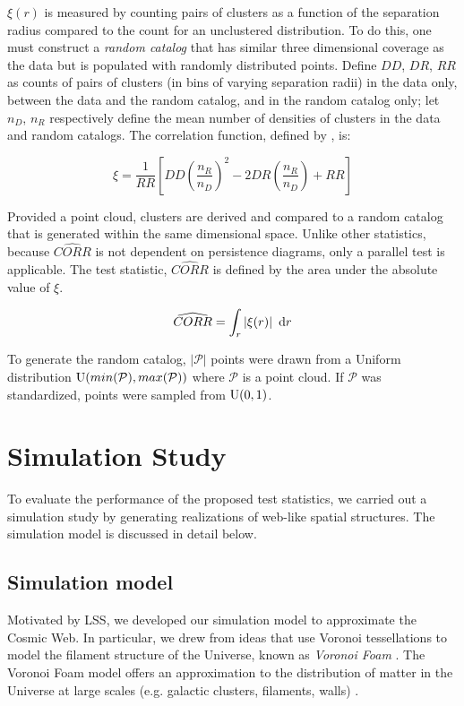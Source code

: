 \documentclass[12pt]{article}
\begin{document}
$\xi(r)$ is measured by counting pairs of clusters as a function of the separation radius compared to the count for an unclustered distribution. To do this, one must construct a \textit{random catalog} that has similar three dimensional coverage as the data but is populated with randomly distributed points. Define $DD$, $DR$, $RR$ as counts of pairs of clusters (in bins of varying separation radii) in the data only, between the data and the random catalog, and in the random catalog only; let $n_{D}$, $n_{R}$ respectively define the mean number of densities of clusters in the data and random catalogs. The correlation function, defined by \citep{landy1993bias}, is:

\[ \xi = \frac{1}{RR}\left[DD\left(\frac{n_{R}}{n_{D}}\right)^{2} - 2DR\left(\frac{n_{R}}{n_{D}}\right) + RR\right] \]

Provided a point cloud, clusters are derived and compared to a random catalog that is generated within the same dimensional space. Unlike other statistics, because $\widehat{CORR}$ is not dependent on persistence diagrams, only a parallel test is applicable. The test statistic, $\widehat{CORR}$ is defined by the area under the absolute value of $\xi$.

\[ \widehat{CORR} = \int_{r} \left | \xi(r) \right | \textup{ d}r \]

To generate the random catalog, $\left | \mathcal P \right |$ points were drawn from a Uniform distribution $\textup{U}(min(\mathcal P), max(\mathcal P))$ where $\mathcal P$ is a point cloud. If $\mathcal P$ was standardized, points were sampled from $\textup{U}(0, 1)$.


\section{Simulation Study}
\label{sec:simulation}

To evaluate the performance of the proposed test statistics, we carried out a simulation study by generating realizations of web-like spatial structures.  The simulation model is discussed in detail below.

\subsection{Simulation model} \label{sec:sim_model} %
Motivated by LSS, we developed our simulation model to approximate the Cosmic Web. In particular, we drew from ideas that use Voronoi tessellations to model the filament structure of the Universe, known as \emph{Voronoi Foam} \citep{icke1987fragmenting, icke1991galaxy, van2007voronoi}.  The Voronoi Foam model offers an approximation to the distribution of matter in the Universe at large scales (e.g. galactic clusters, filaments, walls) \citep{icke1991galaxy}.
\end{document}
